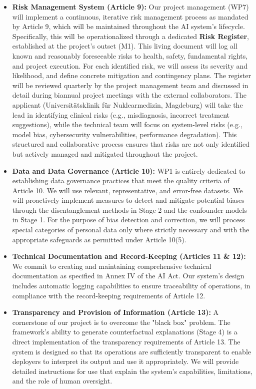 \documentclass[11pt, a4paper]{article}
\begin{document}
\begin{itemize}
    \item \textbf{Risk Management System (Article 9):} Our project management (WP7) will implement a continuous, iterative risk management process as mandated by Article 9, which will be maintained throughout the AI system’s lifecycle. Specifically, this will be operationalized through a dedicated \textbf{Risk Register}, established at the project's outset (M1). This living document will log all known and reasonably foreseeable risks to health, safety, fundamental rights, and project execution. For each identified risk, we will assess its severity and likelihood, and define concrete mitigation and contingency plans. The register will be reviewed quarterly by the project management team and discussed in detail during biannual project meetings with the external collaborators. The applicant (Universitätsklinik für Nuklearmedizin, Magdeburg) will take the lead in identifying clinical risks (e.g., misdiagnosis, incorrect treatment suggestions), while the technical team will focus on system-level risks (e.g., model bias, cybersecurity vulnerabilities, performance degradation). This structured and collaborative process ensures that risks are not only identified but actively managed and mitigated throughout the project.

    \item \textbf{Data and Data Governance (Article 10):} WP1 is entirely dedicated to establishing data governance practices that meet the quality criteria of Article 10. We will use relevant, representative, and error-free datasets. We will proactively implement measures to detect and mitigate potential biases through the disentanglement methods in Stage 2 and the confounder models in Stage 1. For the purpose of bias detection and correction, we will process special categories of personal data only where strictly necessary and with the appropriate safeguards as permitted under Article 10(5).

    \item \textbf{Technical Documentation and Record-Keeping (Articles 11 \& 12):} We commit to creating and maintaining comprehensive technical documentation as specified in Annex IV of the AI Act. Our system's design includes automatic logging capabilities to ensure traceability of operations, in compliance with the record-keeping requirements of Article 12.

    \item \textbf{Transparency and Provision of Information (Article 13):} A cornerstone of our project is to overcome the "black box" problem. The framework's ability to generate counterfactual explanations (Stage 4) is a direct implementation of the transparency requirements of Article 13. The system is designed so that its operations are sufficiently transparent to enable deployers to interpret its output and use it appropriately. We will provide detailed instructions for use that explain the system's capabilities, limitations, and the role of human oversight.


\end{itemize}
\end{document}
